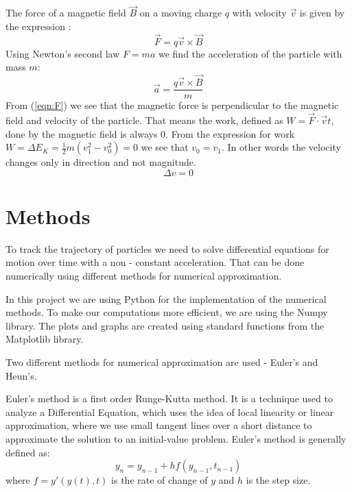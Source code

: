 \documentclass[final,5p,times,twocolumn,authoryear]{elsarticle}
\begin{document}
The force of a magnetic field $\vec{B}$ on a moving charge $q$ with velocity $\vec{v}$ is given by the expression \cite{textbook}:
\begin{equation} \label{eqn:F}
    \vec{F} = q\vec{v}\times\vec{B}
\end{equation}
Using Newton's second law $F = ma$ we find the acceleration of the particle with mass $m$:
\begin{equation} \label{eqn:a}
    \vec{a} = \frac{q\vec{v}\times\vec{B}}{m}
\end{equation}
From (\ref{eqn:F}) we see that the magnetic force is perpendicular to the magnetic field and velocity of the particle. That means the work, defined as $W = \vec{F} \cdot \vec{v}t$, done by the magnetic field is always 0. From the expression for work $W = \Delta E_K = \frac{1}{2}m(v_1^2 - v_0^2) = 0$ we see that $v_0 = v_1$. In other words the velocity changes only in direction and not magnitude. 
\begin{equation} \label{eqn:dv}
    \Delta v = 0
\end{equation}

\section{Methods}
\label{methods}
To track the trajectory of particles we need to solve differential equations for motion over time with a non - constant acceleration. That can be done numerically using different methods for numerical approximation.

In this project we are using Python for the implementation of the numerical methods. To make our computations more efficient, we are using the Numpy library. The plots and graphs are created using standard functions from the Matplotlib library.

Two different methods for numerical approximation are used - Euler's and Heun's.

Euler's method is a first order Runge-Kutta method. It is a technique used to analyze a Differential Equation, which uses the idea of local linearity or linear approximation, where we use small tangent lines over a short distance to approximate the solution to an initial-value problem. Euler's method \cite{lecture} is generally defined as:
\begin{equation}\label{eqn:euler}
        y_n = y_{n-1} + h f(y_{n-1},t_{n-1})
\end{equation}
where $f=y'(y(t),t)$ is the rate of change of $y$ and $h$ is the step size.
\end{document}
